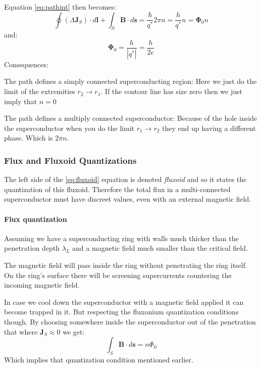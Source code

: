 \documentclass[12pt]{article}
\let\tempthree\enumerate
\let\tempfour\endenumerate
\renewenvironment{enumerate}{\tempthree\setlength{\itemsep}{0pt}}{\tempfour}
\numberwithin{equation}{subsection}
\newcommand\page[1]{
{
}
}
\begin{document}
\page{26}

Equation \ref{eq:pathint} then becomes:
\begin{equation}
    \oint (\Lambda \mathbf{J}_S) \cdot d\mathbf{l} +\int_S \mathbf{B} \cdot d\mathbf{s} = \frac{\hbar}{q^*} 2\pi n=\frac{h}{q^*} n= \mathbf \Phi _0 n
    \label{eq:fluxoid}
    \end{equation}
and:
\begin{equation}
    \mathbf \Phi _0 = \frac{h}{|q^*|} =  \frac{h}{2e} 
\end{equation}
Consequences:
\begin{enumerate}

    \item The path defines a simply connected superconducting region: Here we just do the limit of the extremities $r_2\rightarrow r_1$. If the contour line has size zero then we just imply that $n=0$
    
    \item The path defines a multiply connected superconductor: Because of the hole inside the superconductor when you do the limit $r_1\rightarrow r_2$ they end up having a different phase. Which is $2\pi n$.
\end{enumerate}

\subsubsection{Flux and Fluxoid Quantizations}
The left side of the \ref{eq:fluxoid} equation is denoted \emph{fluxoid} and so it states the quantization of this fluxoid. 
Therefore the total flux in a multi-connected superconductor must have discreet values, even with an external magnetic field.
\paragraph{Flux quantization\\}
Assuming we have a superconducting ring with walls much thicker than the penetration depth $\lambda_L$ and a magnetic field much smaller than the critical field.
\page {27}
The magnetic field will pass inside the ring without penetrating the ring itself. On the ring's surface there will be screening supercurrents countering the incoming magnetic field. 

In case we cool down the superconductor with a magnetic field applied it can become trapped in it. But respecting the fluxonium quantization conditions though. By choosing somewhere inside the superconductor out of the penetration that where $\mathbf J_S\approx 0$ we get:
\begin{equation}
    \int_S \mathbf B \cdot d\mathbf s = n \Phi_0
\end{equation}
Which implies that quantization condition mentioned earlier.
\page{28}
\end{document}
